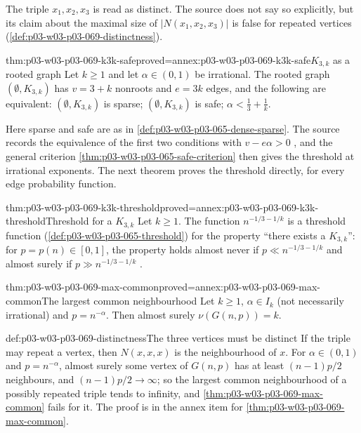 The triple \(x_1,x_2,x_3\) is read as distinct.  The source does not say so
explicitly, but its claim about the maximal size of \(|N(x_1,x_2,x_3)|\) is
false for repeated vertices (\cref{def:p03-w03-p03-069-distinctness}).

\begin{hblemma}{thm:p03-w03-p03-069-k3k-safe}{proved=annex:p03-w03-p03-069-k3k-safe}{\(K_{3,k}\) as a rooted graph}
Let \(k\geq1\) and let \(\alpha\in(0,1)\) be irrational.  The rooted graph
\((\emptyset,K_{3,k})\) has \(v=3+k\) nonroots and \(e=3k\) edges, and the
following are equivalent:
\((\emptyset,K_{3,k})\) is sparse; \((\emptyset,K_{3,k})\) is safe;
\(\alpha<\tfrac13+\tfrac1k\).
\end{hblemma}

Here sparse and safe are as in \cref{def:p03-w03-p03-065-dense-sparse}.  The
source records the equivalence of the first two conditions with
\(v-e\alpha>0\) \cite[p.~16]{Spencer2007LogicRandomStructuresAuthor}, and
the general criterion \cref{thm:p03-w03-p03-065-safe-criterion} then gives the
threshold at irrational exponents.  The next theorem proves the threshold
directly, for every edge probability function.

\begin{hbtheorem}{thm:p03-w03-p03-069-k3k-threshold}{proved=annex:p03-w03-p03-069-k3k-threshold}{Threshold for a \(K_{3,k}\)}
Let \(k\geq1\).  The function \(n^{-1/3-1/k}\) is a threshold function
(\cref{def:p03-w03-p03-065-threshold}) for the property ``there exists a
\(K_{3,k}\)'': for \(p=p(n)\in[0,1]\), the property holds almost never if
\(p\ll n^{-1/3-1/k}\) and almost surely if \(p\gg n^{-1/3-1/k}\)
\cite[p.~16]{Spencer2007LogicRandomStructuresAuthor}.
\end{hbtheorem}

\begin{hbcorollary}{thm:p03-w03-p03-069-max-common}{proved=annex:p03-w03-p03-069-max-common}{The largest common neighbourhood}
Let \(k\geq1\), \(\alpha\in I_k\) (not necessarily irrational) and
\(p=n^{-\alpha}\).  Then almost surely \(\nu(G(n,p))=k\).
\end{hbcorollary}

\begin{hbwarning}{def:p03-w03-p03-069-distinctness}{The three vertices must be distinct}
If the triple may repeat a vertex, then \(N(x,x,x)\) is the neighbourhood of
\(x\).  For \(\alpha\in(0,1)\) and \(p=n^{-\alpha}\), almost surely some
vertex of \(G(n,p)\) has at least \((n-1)p/2\) neighbours, and
\((n-1)p/2\to\infty\); so the largest common neighbourhood of a possibly
repeated triple tends to infinity, and
\cref{thm:p03-w03-p03-069-max-common} fails for it.  The proof is in the
annex item for \cref{thm:p03-w03-p03-069-max-common}.
\end{hbwarning}

